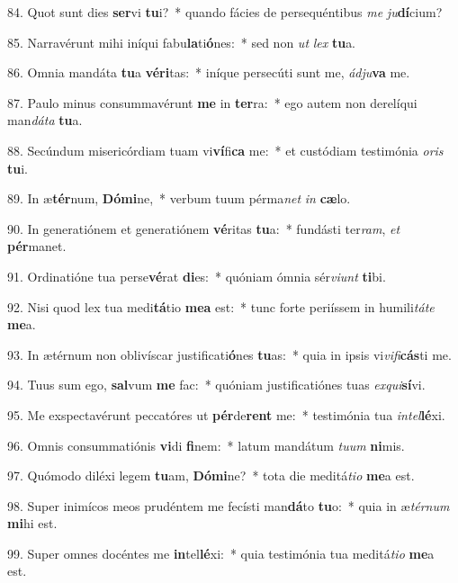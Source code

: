 84. Quot sunt dies \textbf{ser}vi \textbf{tu}i?~*  quando fácies de persequéntibus \textit{me} \textit{ju}\textbf{dí}cium?\

85. Narravérunt mihi iníqui fabu\textbf{la}ti\textbf{ó}nes:~*  sed non \textit{ut} \textit{lex} \textbf{tu}a.\

86. Omnia mandáta \textbf{tu}a \textbf{vé}\textbf{ri}tas:~*  iníque persecúti sunt me, \textit{ád}\textit{ju}\textbf{va} me.\

87. Paulo minus consummavérunt \textbf{me} in \textbf{ter}ra:~*  ego autem non derelíqui man\textit{dá}\textit{ta} \textbf{tu}a.\

88. Secúndum misericórdiam tuam vi\textbf{ví}fi\textbf{ca} me:~*  et custódiam testimónia \textit{o}\textit{ris} \textbf{tu}i.\

89. In æ\textbf{tér}num, \textbf{Dó}\textbf{mi}ne,~*  verbum tuum pérma\textit{net} \textit{in} \textbf{cæ}lo.\

90. In generatiónem et generatiónem \textbf{vé}ritas \textbf{tu}a:~*  fundásti ter\textit{ram}, \textit{et} \textbf{pér}manet.\

91. Ordinatióne tua perse\textbf{vé}rat \textbf{di}es:~*  quóniam ómnia sér\textit{vi}\textit{unt} \textbf{ti}bi.\

92. Nisi quod lex tua medi\textbf{tá}tio \textbf{me}\textbf{a} est:~*  tunc forte periíssem in humili\textit{tá}\textit{te} \textbf{me}a.\

93. In ætérnum non oblivíscar justificati\textbf{ó}nes \textbf{tu}as:~*  quia in ipsis vi\textit{vi}\textit{fi}\textbf{cás}ti me.\

94. Tuus sum ego, \textbf{sal}vum \textbf{me} fac:~*  quóniam justificatiónes tuas \textit{ex}\textit{qui}\textbf{sí}vi.\

95. Me exspectavérunt peccatóres ut \textbf{pér}de\textbf{rent} me:~*  testimónia tua \textit{in}\textit{tel}\textbf{lé}xi.\

96. Omnis consummatiónis \textbf{vi}di \textbf{fi}nem:~*  latum mandátum \textit{tu}\textit{um} \textbf{ni}mis.\

97. Quómodo diléxi legem \textbf{tu}am, \textbf{Dó}\textbf{mi}ne?~*  tota die meditá\textit{ti}\textit{o} \textbf{me}a est.\

98. Super inimícos meos prudéntem me fecísti man\textbf{dá}to \textbf{tu}o:~*  quia in æ\textit{tér}\textit{num} \textbf{mi}hi est.\

99. Super omnes docéntes me \textbf{in}tel\textbf{lé}xi:~*  quia testimónia tua meditá\textit{ti}\textit{o} \textbf{me}a est.\

